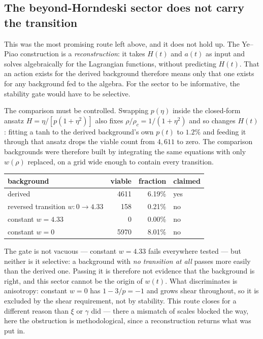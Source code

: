 \documentclass[a4paper,11pt]{article}
\begin{document}
\subsection{The beyond-Horndeski sector does not carry the transition}

This was the most promising route left above, and it does not hold up. The Ye--Piao construction is a \emph{reconstruction}: it takes $H(t)$ and $a(t)$ as input and solves algebraically for the Lagrangian functions, without predicting $H(t)$. That an action exists for the derived background therefore means only that one exists for any background fed to the algebra. For the sector to be informative, the stability gate would have to be selective.

The comparison must be controlled. Swapping $p(\eta)$ inside the closed-form ansatz $H=\eta/[p(1+\eta^2)]$ also fixes $\rho/\rho_c=1/(1+\eta^2)$ and so changes $H(t)$: fitting a tanh to the derived background's own $p(t)$ to $1.2\%$ and feeding it through that ansatz drops the viable count from $4{,}611$ to zero. The comparison backgrounds were therefore built by integrating the same equations with only $w(\rho)$ replaced, on a grid wide enough to contain every transition.

\begin{center}
\begin{tabular}{lrrl}
\hline
background & viable & fraction & claimed \\
\hline
derived & 4611 & 6.19\% & yes \\
reversed transition $w:0\to4.33$ & 158 & 0.21\% & no \\
constant $w=4.33$ & 0 & 0.00\% & no \\
constant $w=0$ & 5970 & 8.01\% & no \\
\hline
\end{tabular}
\end{center}

The gate is not vacuous --- constant $w=4.33$ fails everywhere tested --- but neither is it selective: a background with \emph{no transition at all} passes more easily than the derived one. Passing it is therefore not evidence that the background is right, and this sector cannot be the origin of $w(t)$. What discriminates is anisotropy: constant $w=0$ has $1-3/p=-1$ and grows shear throughout, so it is excluded by the shear requirement, not by stability. This route closes for a different reason than $\xi$ or $\gamma$ did --- there a mismatch of scales blocked the way, here the obstruction is methodological, since a reconstruction returns what was put in.
\end{document}

